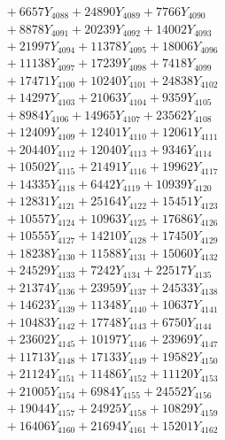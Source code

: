\documentclass[a4paper,10pt]{article}
\begin{document}
{\begin{align}
&\;  + 6657 Y_{4088} + 24890 Y_{4089} + 7766 Y_{4090} \\[0.3ex]
&\;  + 8878 Y_{4091} + 20239 Y_{4092} + 14002 Y_{4093} \\[0.3ex]
&\;  + 21997 Y_{4094} + 11378 Y_{4095} + 18006 Y_{4096} \\[0.3ex]
&\;  + 11138 Y_{4097} + 17239 Y_{4098} + 7418 Y_{4099} \\[0.3ex]
&\;  + 17471 Y_{4100} + 10240 Y_{4101} + 24838 Y_{4102} \\[0.3ex]
&\;  + 14297 Y_{4103} + 21063 Y_{4104} + 9359 Y_{4105} \\[0.3ex]
&\;  + 8984 Y_{4106} + 14965 Y_{4107} + 23562 Y_{4108} \\[0.5ex]\allowbreak
&\;  + 12409 Y_{4109} + 12401 Y_{4110} + 12061 Y_{4111} \\[0.3ex]
&\;  + 20440 Y_{4112} + 12040 Y_{4113} + 9346 Y_{4114} \\[0.3ex]
&\;  + 10502 Y_{4115} + 21491 Y_{4116} + 19962 Y_{4117} \\[0.3ex]
&\;  + 14335 Y_{4118} + 6442 Y_{4119} + 10939 Y_{4120} \\[0.3ex]
&\;  + 12831 Y_{4121} + 25164 Y_{4122} + 15451 Y_{4123} \\[0.3ex]
&\;  + 10557 Y_{4124} + 10963 Y_{4125} + 17686 Y_{4126} \\[0.3ex]
&\;  + 10555 Y_{4127} + 14210 Y_{4128} + 17450 Y_{4129} \\[0.3ex]
&\;  + 18238 Y_{4130} + 11588 Y_{4131} + 15060 Y_{4132} \\[0.3ex]
&\;  + 24529 Y_{4133} + 7242 Y_{4134} + 22517 Y_{4135} \\[0.3ex]
&\;  + 21374 Y_{4136} + 23959 Y_{4137} + 24533 Y_{4138} \\[0.5ex]\allowbreak
&\;  + 14623 Y_{4139} + 11348 Y_{4140} + 10637 Y_{4141} \\[0.3ex]
&\;  + 10483 Y_{4142} + 17748 Y_{4143} + 6750 Y_{4144} \\[0.3ex]
&\;  + 23602 Y_{4145} + 10197 Y_{4146} + 23969 Y_{4147} \\[0.3ex]
&\;  + 11713 Y_{4148} + 17133 Y_{4149} + 19582 Y_{4150} \\[0.3ex]
&\;  + 21124 Y_{4151} + 11486 Y_{4152} + 11120 Y_{4153} \\[0.3ex]
&\;  + 21005 Y_{4154} + 6984 Y_{4155} + 24552 Y_{4156} \\[0.3ex]
&\;  + 19044 Y_{4157} + 24925 Y_{4158} + 10829 Y_{4159} \\[0.3ex]
&\;  + 16406 Y_{4160} + 21694 Y_{4161} + 15201 Y_{4162} \\[0.3ex]

\end{align}}
\end{document}
